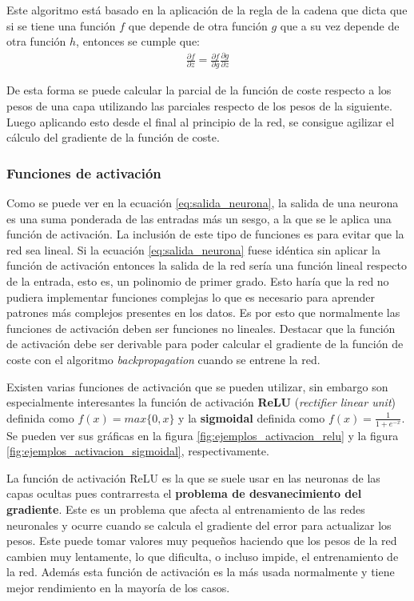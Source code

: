 Este algoritmo está basado en la aplicación de la regla de la cadena que dicta que si se tiene una función $f$ que depende de otra función $g$ que a su vez depende de otra función $h$, entonces se cumple que:
\begin{align*}
\frac{\partial f}{\partial z} = \frac{\partial f}{\partial g} \frac{\partial g}{\partial z}
\end{align*}

De esta forma se puede calcular la parcial de la función de coste respecto a los pesos de una capa utilizando las parciales respecto de los pesos de la siguiente. Luego aplicando esto desde el final al principio de la red, se consigue agilizar el cálculo del gradiente de la función de coste.

\subsubsection{Funciones de activación}

Como se puede ver en la ecuación \eqref{eq:salida_neurona}, la salida de una neurona es una suma ponderada de las entradas más un sesgo, a la que se le aplica una función de activación. La inclusión de este tipo de funciones es para evitar que la red sea lineal. Si la ecuación \eqref{eq:salida_neurona} fuese idéntica sin aplicar la función de activación entonces la salida de la red sería una función lineal respecto de la entrada, esto es, un polinomio de primer grado. Esto haría que la red no pudiera implementar funciones complejas lo que es necesario para aprender patrones más complejos presentes en los datos.  Es por esto que normalmente las funciones de activación deben ser funciones no lineales. Destacar que la función de activación debe ser derivable para poder calcular el gradiente de la función de coste con el algoritmo \textit{backpropagation} cuando se entrene la red.

Existen varias funciones de activación que se pueden utilizar, sin embargo son especialmente interesantes la función de activación \textbf{ReLU} (\textit{rectifier linear unit}) definida como $ f(x) = max\{0,x\}$ y la \textbf{sigmoidal} definida como $f(x) = \frac{1}{1+e^{-x}}$. Se pueden ver sus gráficas en la figura \ref{fig:ejemplos_activacion_relu} y la figura \ref{fig:ejemplos_activacion_sigmoidal}, respectivamente.

La función de activación ReLU es la que se suele usar en las neuronas de las capas ocultas pues contrarresta el \textbf{problema de desvanecimiento del gradiente}. Este es un problema que afecta al entrenamiento de las redes neuronales y ocurre cuando se calcula el gradiente del error para actualizar los pesos. Este puede tomar valores muy pequeños haciendo que los pesos de la red cambien muy lentamente, lo que dificulta, o incluso impide, el entrenamiento de la red. Además esta función de activación es la más usada normalmente y tiene mejor rendimiento en la mayoría de los casos.

